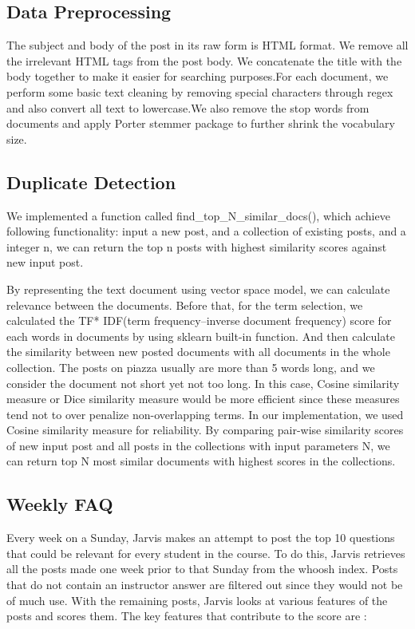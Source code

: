 \documentclass[sigconf]{acmart}
\begin{document}
\subsection{Data Preprocessing}
The subject and body of the post in its raw form is HTML format. We remove all the irrelevant HTML tags from the post body. We concatenate the title with the body together to make it easier for searching purposes.For each document, we perform some basic text cleaning by removing special characters through regex and also convert all text to lowercase.We also remove the stop words from documents and apply Porter stemmer \cite{porterstem} package to further shrink the vocabulary size. 

\subsection{Duplicate Detection}
We implemented a function called find\_top\_N\_similar\_docs(), which achieve following functionality: input a new post, and a collection of existing posts, and a integer n, we can return the top n posts with highest similarity scores against new input post. 

By representing the text document using vector space model, we can calculate relevance between the documents. Before that, for the term selection, we calculated the TF* IDF(term frequency–inverse document frequency) score for each words in documents by using sklearn built-in function. And then calculate the similarity between new posted documents with all documents in the whole collection. The posts on piazza usually are more than 5 words long, and we consider the document not short yet not too long. In this case, Cosine similarity measure or Dice similarity measure would be more efficient since these measures tend not to over penalize non-overlapping terms. In our implementation, we used Cosine similarity measure for reliability. By comparing pair-wise similarity scores of new input post and all posts in the collections  with input parameters N, we can return top N most similar documents with highest scores in the collections. 


\subsection{Weekly FAQ}
Every week on a Sunday, Jarvis makes an attempt to post the top 10 questions that could be relevant for every student in the course. To do this, Jarvis retrieves all the posts made one week prior to that Sunday from the whoosh index. Posts that do not contain an instructor answer are filtered out since they would not be of much use. With the remaining posts, Jarvis looks at various features of the posts and scores them. The key features that contribute to the score are :
\end{document}
